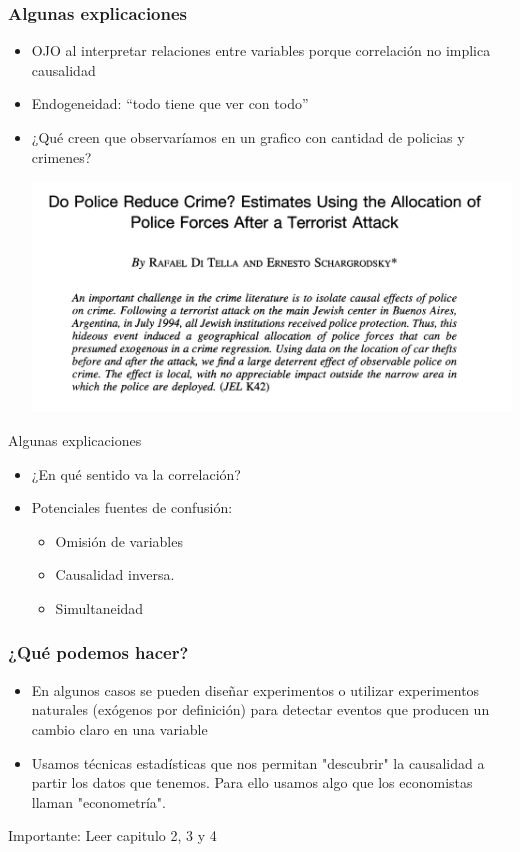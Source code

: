 \documentclass{beamer}
\begin{document}
\begin{frame} \label{uno}
\frametitle{Algunas explicaciones}
\begin{itemize}
    \item OJO al interpretar relaciones entre variables porque correlación no implica causalidad  \vspace{2mm}
    \item Endogeneidad: ``todo tiene que ver con todo'' \vspace{1mm}
    \item ¿Qué creen que observaríamos en un grafico con cantidad de policias y crimenes?
    \begin{center}
        \includegraphics[scale=0.10]{../Figures/Introduccion_1.7_Dopolice.jpg}
    \end{center}
\end{itemize}
\end{frame}

\begin{frame}{Algunas explicaciones}
    \begin{itemize} 
        \item ¿En qué sentido va la correlación?
           \item Potenciales fuentes de confusión:
           \begin{itemize}
               \item Omisión de variables
               \item Causalidad inversa.
               \item Simultaneidad
           \end{itemize}
       \end{itemize}
\end{frame}

\begin{frame} 
\frametitle{¿Qué podemos hacer?}
\begin{itemize}

    \item  En algunos casos se pueden diseñar experimentos o utilizar experimentos naturales (exógenos por definición) para detectar eventos que producen un cambio claro en una variable
     \item Usamos técnicas estadísticas que nos permitan "descubrir" la causalidad a partir los datos que tenemos. Para ello usamos algo que los economistas llaman "econometría". 
\end{itemize}
\end{frame}

\begin{frame}
\begin{center}
    \Huge Importante: Leer capitulo 2, 3 y 4
\end{center}
\end{frame}
\end{document}
